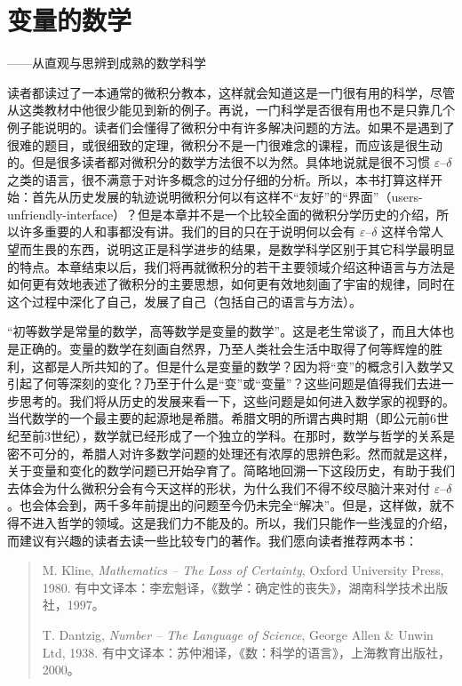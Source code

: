 \chapter[变量的数学——从直观与思辨到成熟的数学科学]{变量的数学}
\begin{center}
{\large\sffamily\color{BellaGray}——从直观与思辨到成熟的数学科学}
\end{center}
\vspace{8mm}

读者都读过了一本通常的微积分教本，这样就会知道这是一门很有用的科学，尽管从这类教材中他很少能见到新的例子。再说，一门科学是否很有用也不是只靠几个例子能说明的。读者们会懂得了微积分中有许多解决问题的方法。如果不是遇到了很难的题目，或很细致的定理，微积分不是一门很难念的课程，而应该是很生动的。但是很多读者都对微积分的数学方法很不以为然。具体地说就是很不习惯 $\varepsilon$--$\delta$ 之类的语言，很不满意于对许多概念的过分仔细的分析。所以，本书打算这样开始：首先从历史发展的轨迹说明微积分何以有这样不“友好”的“界面”（users-unfriendly-interface）？但是本章并不是一个比较全面的微积分学历史的介绍，所以许多重要的人和事都没有讲。我们的目的只在于说明何以会有 $\varepsilon$--$\delta$ 这样令常人望而生畏的东西，说明这正是科学进步的结果，是数学科学区别于其它科学最明显的特点。本章结束以后，我们将再就微积分的若干主要领域介绍这种语言与方法是如何更有效地表述了微积分的主要思想，如何更有效地刻画了宇宙的规律，同时在这个过程中深化了自己，发展了自己（包括自己的语言与方法）。

“初等数学是常量的数学，高等数学是变量的数学”。这是老生常谈了，而且大体也是正确的。变量的数学在刻画自然界，乃至人类社会生活中取得了何等辉煌的胜利，这都是人所共知的了。但是什么是变量的数学？因为将“变”的概念引入数学又引起了何等深刻的变化？乃至于什么是“变”或“变量”？这些问题是值得我们去进一步思考的。我们将从历史的发展来看一下，这些问题是如何进入数学家的视野的。当代数学的一个最主要的起源地是希腊。希腊文明的所谓古典时期（即公元前6世纪至前3世纪），数学就已经形成了一个独立的学科。在那时，数学与哲学的关系是密不可分的，希腊人对许多数学问题的处理还有浓厚的思辨色彩。然而就是这样，关于变量和变化的数学问题已开始孕育了。简略地回溯一下这段历史，有助于我们去体会为什么微积分会有今天这样的形状，为什么我们不得不绞尽脑汁来对付 $\varepsilon$--$\delta$。也会体会到，两千多年前提出的问题至今仍未完全“解决”。但是，这样做，就不得不进入哲学的领域。这是我们力不能及的。所以，我们只能作一些浅显的介绍，而建议有兴趣的读者去读一些比较专门的著作。我们愿向读者推荐两本书：

\begin{quote}\small
M. Kline, \textit{Mathematics -- The Loss of Certainty}, Oxford University Press, 1980. 有中文译本：李宏魁译，《数学：确定性的丧失》，湖南科学技术出版社，1997。

T. Dantzig, \textit{Number -- The Language of Science}, George Allen \& Unwin Ltd, 1938. 有中文译本：苏仲湘译，《数：科学的语言》，上海教育出版社，2000。
\end{quote}

